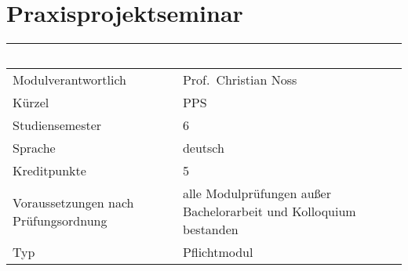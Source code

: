 \chapter{Praxisprojektseminar}\label{praxisprojektseminar}

\begin{longtable}[]{@{}ll@{}}
\toprule
\begin{minipage}[b]{0.12\columnwidth}\raggedright\strut
~\strut
\end{minipage} & \begin{minipage}[b]{0.12\columnwidth}\raggedright\strut
~\strut
\end{minipage}\tabularnewline
\midrule
\endhead
\begin{minipage}[t]{0.12\columnwidth}\raggedright\strut
Modulverantwortlich\strut
\end{minipage} & \begin{minipage}[t]{0.12\columnwidth}\raggedright\strut
Prof.~Christian Noss\strut
\end{minipage}\tabularnewline
\begin{minipage}[t]{0.12\columnwidth}\raggedright\strut
Kürzel\strut
\end{minipage} & \begin{minipage}[t]{0.12\columnwidth}\raggedright\strut
PPS\strut
\end{minipage}\tabularnewline
\begin{minipage}[t]{0.12\columnwidth}\raggedright\strut
Studiensemester\strut
\end{minipage} & \begin{minipage}[t]{0.12\columnwidth}\raggedright\strut
6\strut
\end{minipage}\tabularnewline
\begin{minipage}[t]{0.12\columnwidth}\raggedright\strut
Sprache\strut
\end{minipage} & \begin{minipage}[t]{0.12\columnwidth}\raggedright\strut
deutsch\strut
\end{minipage}\tabularnewline
\begin{minipage}[t]{0.12\columnwidth}\raggedright\strut
Kreditpunkte\strut
\end{minipage} & \begin{minipage}[t]{0.12\columnwidth}\raggedright\strut
5\strut
\end{minipage}\tabularnewline
\begin{minipage}[t]{0.12\columnwidth}\raggedright\strut
Voraussetzungen nach Prüfungsordnung\strut
\end{minipage} & \begin{minipage}[t]{0.12\columnwidth}\raggedright\strut
alle Modulprüfungen außer Bachelorarbeit und Kolloquium bestanden\strut
\end{minipage}\tabularnewline
\begin{minipage}[t]{0.12\columnwidth}\raggedright\strut
Typ\strut
\end{minipage} & \begin{minipage}[t]{0.12\columnwidth}\raggedright\strut
Pflichtmodul\strut
\end{minipage}\tabularnewline
\bottomrule
\end{longtable}

